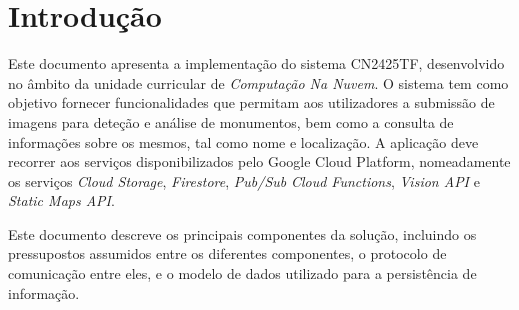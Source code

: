 % 
%  
%
\chapter{Introdução}
\label{cha:introduction}

Este documento apresenta a implementação do sistema CN2425TF, desenvolvido no âmbito da unidade curricular
de \textit{Computação Na Nuvem}. O sistema tem como objetivo fornecer funcionalidades que permitam aos utilizadores
a submissão de imagens para deteção e análise de monumentos, bem como a consulta de informações
sobre os mesmos, tal como nome e localização. A aplicação deve recorrer aos serviços disponibilizados pelo
Google Cloud Platform, nomeadamente os serviços \textit{Cloud Storage}, \textit{Firestore}, 
\textit{Pub/Sub} \textit{Cloud Functions}, \textit{Vision API} e \textit{Static Maps API}.

Este documento descreve os principais componentes da solução, incluindo os pressupostos assumidos
entre os diferentes componentes, o protocolo de comunicação entre eles, e o modelo de dados utilizado
para a persistência de informação.